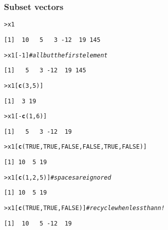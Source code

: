 \documentclass[13pt,aspectratio=169]{beamer}\usepackage[]{graphicx}\usepackage[]{color}
\makeatletter
\newcommand{\hlnum}[1]{\textcolor[rgb]{0.686,0.059,0.569}{#1}}%
\newcommand{\hlcom}[1]{\textcolor[rgb]{0.678,0.584,0.686}{\textit{#1}}}%
\newcommand{\hlopt}[1]{\textcolor[rgb]{0,0,0}{#1}}%
\newcommand{\hlstd}[1]{\textcolor[rgb]{0.345,0.345,0.345}{#1}}%
\newcommand{\hlkwd}[1]{\textcolor[rgb]{0.737,0.353,0.396}{\textbf{#1}}}%
\newenvironment{kframe}{%
 \def\at@end@of@kframe{}%
 \ifinner\ifhmode%
  \def\at@end@of@kframe{\end{minipage}}%
  \begin{minipage}{\columnwidth}%
 \fi\fi%
 \def\FrameCommand##1{\hskip\@totalleftmargin \hskip-\fboxsep
 \colorbox{shadecolor}{##1}\hskip-\fboxsep
     \hskip-\linewidth \hskip-\@totalleftmargin \hskip\columnwidth}%
 \MakeFramed {\advance\hsize-\width
   \@totalleftmargin\z@ \linewidth\hsize
   \@setminipage}}%
 {\par\unskip\endMakeFramed%
 \at@end@of@kframe}
\newenvironment{knitrout}{}{} %
\renewenvironment{knitrout}{\setlength{\topsep}{0mm}}{}
\makeatother
\begin{document}
\begin{frame}[fragile]
    \frametitle{Subset vectors}
\begin{knitrout}\small
{}\color{fgcolor}\begin{kframe}
\begin{alltt}
\hlstd{> }\hlstd{x1}
\end{alltt}
\begin{verbatim}
[1]  10   5   3 -12  19 145
\end{verbatim}
\begin{alltt}
\hlstd{> }\hlstd{x1[}\hlopt{-}\hlnum{1}\hlstd{]} \hlcom{# all but the first element}
\end{alltt}
\begin{verbatim}
[1]   5   3 -12  19 145
\end{verbatim}
\begin{alltt}
\hlstd{> }\hlstd{x1[}\hlkwd{c}\hlstd{(}\hlnum{3}\hlstd{,} \hlnum{5}\hlstd{)]}
\end{alltt}
\begin{verbatim}
[1]  3 19
\end{verbatim}
\begin{alltt}
\hlstd{> }\hlstd{x1[}\hlopt{-}\hlkwd{c}\hlstd{(}\hlnum{1}\hlstd{,} \hlnum{6}\hlstd{)]}
\end{alltt}
\begin{verbatim}
[1]   5   3 -12  19
\end{verbatim}
\begin{alltt}
\hlstd{> }\hlstd{x1[}\hlkwd{c}\hlstd{(}\hlnum{TRUE}\hlstd{,} \hlnum{TRUE}\hlstd{,} \hlnum{FALSE}\hlstd{,} \hlnum{FALSE}\hlstd{,} \hlnum{TRUE}\hlstd{,} \hlnum{FALSE}\hlstd{)]}
\end{alltt}
\begin{verbatim}
[1] 10  5 19
\end{verbatim}
\begin{alltt}
\hlstd{> }\hlstd{x1[}\hlkwd{c}\hlstd{(}   \hlnum{1}\hlstd{,}    \hlnum{2}\hlstd{,}                  \hlnum{5}\hlstd{)]} \hlcom{# spaces are ignored}
\end{alltt}
\begin{verbatim}
[1] 10  5 19
\end{verbatim}
\begin{alltt}
\hlstd{> }\hlstd{x1[}\hlkwd{c}\hlstd{(}\hlnum{TRUE}\hlstd{,} \hlnum{TRUE}\hlstd{,} \hlnum{FALSE}\hlstd{)]} \hlcom{# recycle when less than n!}
\end{alltt}
\begin{verbatim}
[1]  10   5 -12  19
\end{verbatim}
\end{kframe}
\end{knitrout}
\end{frame}
\end{document}
